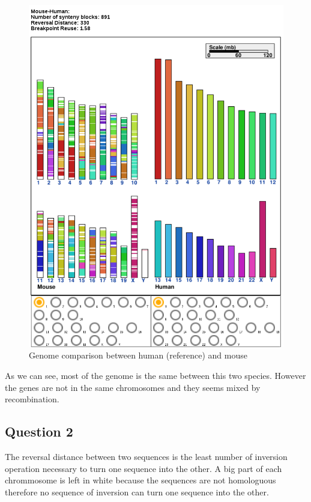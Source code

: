 \documentclass[]{article}
\theoremstyle{definition}
\begin{document}
\begin{figure}[h!]
	\centering
	\includegraphics*[height = 0.7\textheight]{../human_mouse.png}
	\caption{\label{h_m} Genome comparison between human (reference) and mouse }
\end{figure}

As we can see, most of the genome is the same between this two species. However the genes are not in the same chromosomes and they seems mixed by recombination.


\subsection{Question 2}

The reversal distance between two sequences is the least number of inversion operation necessary to turn one sequence into the other. A big part of each chrommosome is left in white because the sequences are not homologuous therefore no sequence of inversion can turn one sequence into the other. \\
\end{document}

